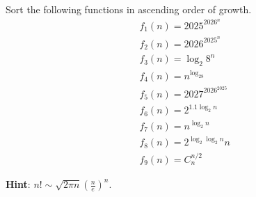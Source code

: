 \problem{}

Sort the following functions in ascending order of growth.
\begin{align}
    &f_1(n)=2025^{2026^n} \\
    &f_2(n)=2026^{2025^n} \\
    &f_3(n)=\log_2{8^{n}} \\
    &f_4(n)=n^{\log_28}  \\ %
    &f_5(n)=2027^{2026^{2025}} \\
    &f_6(n)=2^{1.1\log_2n}  \\
    &f_7(n)=n^{\log_2n} \\
    &f_8(n)=2^{\log_2\log_2{n}} n\\
    &f_9(n)= C^{n/2}_n
\end{align}

\textbf{Hint}: $n! \sim \sqrt{2 \pi n } ( \frac{n}{e})^n$.

\solution{
}

\newpage